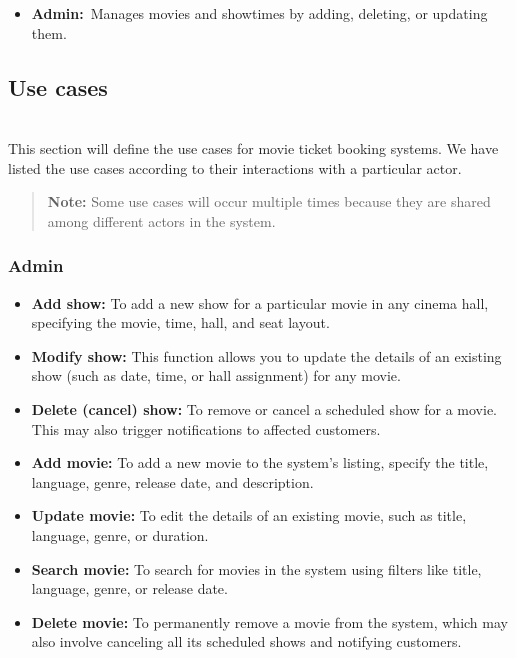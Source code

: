 \begin{itemize}
\item
\protect{}\label{Wkaj7wMiOgfgZuMxKMkn_}
\textbf{Admin:}~Manages movies and showtimes by adding, deleting, or updating them.
\end{itemize}

\subsection{Use cases}\label{D9dj_bk8CFBKmWYaCokIb}
\\
This section will define the use cases for movie ticket booking systems. We have listed the use cases according to their interactions with a particular actor.
\begin{quote}
\textbf{Note:} Some use cases will occur multiple times because they are shared among different actors in the system.
\end{quote}
\subsubsection{Admin}\label{pVIi39nDXtJsLCZ1tZClS}

\begin{itemize}
\item
\protect{}\label{1aUN-I2VbE3U-NdBckerq}
\textbf{Add show:} To add a new show for a particular movie in any cinema hall, specifying the movie, time, hall, and seat layout.
\item
\protect{}\label{Q6mSSKFqs2MFpgwN26bgp}
\textbf{Modify show:} This function allows you to update the details of an existing show (such as date, time, or hall assignment) for any movie.
\item
\protect{}\label{Mx-cThz0VKIWCO_zJuolg}
\textbf{Delete (cancel) show:} To remove or cancel a scheduled show for a movie. This may also trigger notifications to affected customers.
\item
\protect{}\label{ozFfJk1udp2nK50Kmpm7d}
\textbf{Add movie:} To add a new movie to the system's listing, specify the title, language, genre, release date, and description.
\item
\protect{}\label{GkbBT4qXK_3E6u7_kNj_G}
\textbf{Update movie:} To edit the details of an existing movie, such as title, language, genre, or duration.
\item
\protect{}\label{qLp5rJUoIT-CuM19K8Zqf}
\textbf{Search movie:} To search for movies in the system using filters like title, language, genre, or release date.
\item
\protect{}\label{yf5MxcwtkwfgoEQLkqXLr}
\textbf{Delete movie:} To permanently remove a movie from the system, which may also involve canceling all its scheduled shows and notifying customers.
\end{itemize}


